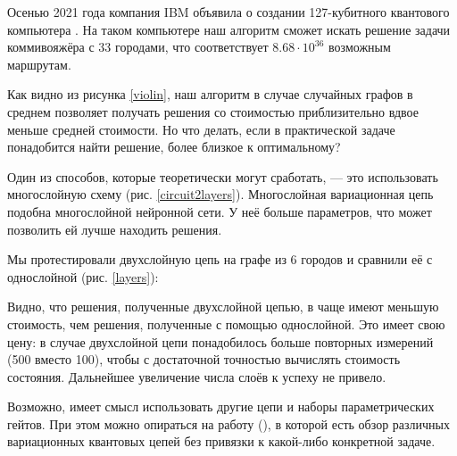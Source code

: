 
Осенью 2021 года компания IBM объявила о создании 127-кубитного квантового компьютера \cite{IBM-127}. На таком компьютере наш алгоритм сможет искать решение задачи коммивояжёра с 33 городами, что соответствует $8.68 \cdot 10^{36}$ возможным маршрутам.




Как видно из рисунка \ref{violin}, наш алгоритм в случае случайных графов в среднем позволяет получать решения со стоимостью приблизительно вдвое меньше средней стоимости. 
Но что делать, если в практической задаче понадобится найти решение, более близкое к оптимальному?

Один из способов, которые теоретически могут сработать, --- это использовать многослойную схему (рис. \ref{circuit2layers}). Многослойная вариационная цепь подобна многослойной нейронной сети. У неё больше параметров, что может позволить ей лучше находить решения. 



Мы протестировали двухслойную цепь на графе из 6 городов и сравнили её с однослойной (рис. \ref{layers}):


Видно, что решения, полученные двухслойной цепью, в чаще имеют меньшую стоимость, чем решения, полученные с помощью однослойной. Это имеет свою цену: в случае двухслойной цепи понадобилось больше повторных измерений (500 вместо 100), чтобы с достаточной точностью вычислять стоимость состояния. Дальнейшее увеличение числа слоёв к успеху не привело. 

Возможно, имеет смысл использовать другие цепи и наборы параметрических гейтов. При этом можно опираться на работу \cite{Expressibility} (\citeyear{Expressibility}), в которой есть обзор различных вариационных квантовых цепей без привязки к какой-либо конкретной задаче.

